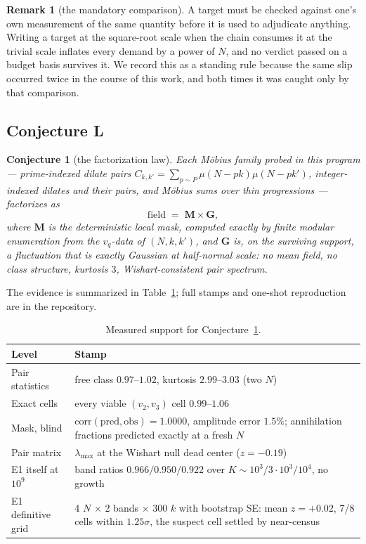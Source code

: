 \documentclass[11pt,a4paper]{article}
\theoremstyle{plain}
\newtheorem{conjecture}[theorem]{Conjecture}
\theoremstyle{definition}
\newtheorem{remark}[theorem]{Remark}
\begin{document}
\begin{remark}[the mandatory comparison]\label{rem:scale}
A target must be checked against one's own measurement of the same
quantity before it is used to adjudicate anything. Writing a target at
the square-root scale when the chain consumes it at the trivial scale
inflates every demand by a power of $N$, and no verdict passed on a
budget basis survives it. We record this as a standing rule because
the same slip occurred twice in the course of this work, and both times
it was caught only by that comparison.
\end{remark}

\subsection{Conjecture L}

\begin{conjecture}[the factorization law]\label{conj:L}
Each M\"obius family probed in this program --- prime-indexed dilate
pairs $C_{k,k'} = \sum_{p\sim P}\mu(N-pk)\mu(N-pk')$, integer-indexed
dilates and their pairs, and M\"obius sums over thin progressions ---
factorizes as
\[
  \text{field} \;=\; \mathbf M \times \mathbf G,
\]
where $\mathbf M$ is the deterministic local mask, computed exactly by
finite modular enumeration from the $v_q$-data of $(N,k,k')$, and
$\mathbf G$ is, on the surviving support, a fluctuation that is
exactly Gaussian at half-normal scale: no mean field, no class
structure, kurtosis $3$, Wishart-consistent pair spectrum.
\end{conjecture}

The evidence is summarized in Table~\ref{tab:L}; full stamps and
one-shot reproduction are in the repository.

\begin{table}[t]
\centering\small
\begin{tabular}{p{}p{}}
\hline
Level & Stamp\\
\hline
Pair statistics & free class $0.97$--$1.02$, kurtosis $2.99$--$3.03$
 (two $N$)\\
Exact cells & every viable $(v_2,v_3)$ cell $0.99$--$1.06$\\
Mask, blind & $\mathrm{corr}(\text{pred},\text{obs}) = 1.0000$,
 amplitude error $1.5\%$; annihilation fractions predicted exactly at
 a fresh $N$\\
Pair matrix & $\lambda_{\max}$ at the Wishart null dead center
 ($z = -0.19$)\\
E1 itself at $10^9$ & band ratios $0.966 / 0.950 / 0.922$ over
 $K \sim 10^3/3\cdot10^3/10^4$, no growth\\
E1 definitive grid & 4 $N$ $\times$ 2 bands $\times$ 300 $k$ with
 bootstrap SE: mean $z = +0.02$, 7/8 cells within $1.25\sigma$, the
 suspect cell settled by near-census\\
\hline
\end{tabular}
\caption{Measured support for Conjecture~\ref{conj:L}.}
\label{tab:L}
\end{table}
\end{document}
